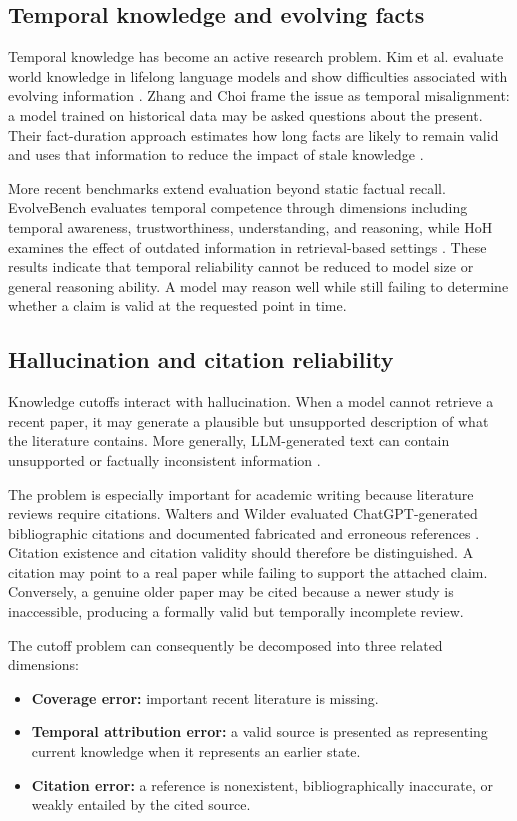 \documentclass[manuscript,screen]{acmart}
\begin{document}
\subsection{Temporal knowledge and evolving facts}\label{subsec:temporal}
Temporal knowledge has become an active research problem. Kim et al. evaluate world knowledge in lifelong
language models and show difficulties associated with evolving information \cite{kim2024}. Zhang and Choi
frame the issue as temporal misalignment: a model trained on historical data may be asked questions about
the present. Their fact-duration approach estimates how long facts are likely to remain valid and uses that
information to reduce the impact of stale knowledge \cite{zhang2023}.

More recent benchmarks extend evaluation beyond static factual recall. EvolveBench evaluates temporal
competence through dimensions including temporal awareness, trustworthiness, understanding, and reasoning,
while HoH examines the effect of outdated information in retrieval-based settings \cite{zhu2025,ouyang2025}.
These results indicate that temporal reliability cannot be reduced to model size or general reasoning ability.
A model may reason well while still failing to determine whether a claim is valid at the requested point in time.

\subsection{Hallucination and citation reliability}\label{subsec:hallucination}
Knowledge cutoffs interact with hallucination. When a model cannot retrieve a recent paper, it may generate a
plausible but unsupported description of what the literature contains. More generally, LLM-generated text can
contain unsupported or factually inconsistent information \cite{ji2023,maynez2020}.

The problem is especially important for academic writing because literature reviews require citations. Walters
and Wilder evaluated ChatGPT-generated bibliographic citations and documented fabricated and erroneous
references \cite{walters2023}. Citation existence and citation validity should therefore be distinguished. A
citation may point to a real paper while failing to support the attached claim. Conversely, a genuine older paper
may be cited because a newer study is inaccessible, producing a formally valid but temporally incomplete review.

The cutoff problem can consequently be decomposed into three related dimensions:
\begin{itemize}[leftmargin=*]
    \item \textbf{Coverage error:} important recent literature is missing.
    \item \textbf{Temporal attribution error:} a valid source is presented as representing current knowledge when it represents an earlier state.
    \item \textbf{Citation error:} a reference is nonexistent, bibliographically inaccurate, or weakly entailed by the cited source.
\end{itemize}
\end{document}
